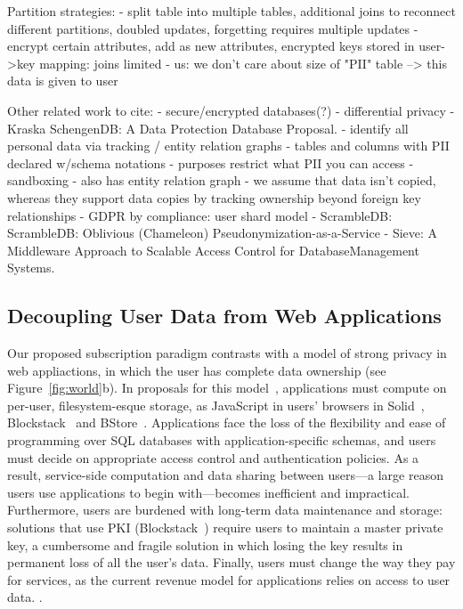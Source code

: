 Partition strategies:
- split table into multiple tables, additional joins to reconnect different partitions, doubled updates, forgetting requires multiple
updates
- encrypt certain attributes, add as new attributes, encrypted keys stored in user->key mapping: joins limited
- us: we don't care about size of "PII" table --> this data is given to user

Other related work to cite: 
- secure/encrypted databases(?)
- differential privacy
- Kraska SchengenDB: A Data Protection Database Proposal.
    - identify all personal data via tracking / entity relation graphs
    - tables and columns with PII declared w/schema notations
    - purposes restrict what PII you can access
    - sandboxing
    - also has entity relation graph
    - we assume that data isn't copied, whereas they support data copies by tracking ownership
    beyond foreign key relationships
- GDPR by compliance: user shard model  
- ScrambleDB: ScrambleDB: Oblivious (Chameleon) Pseudonymization-as-a-Service
- Sieve: A Middleware Approach to Scalable Access Control for DatabaseManagement Systems. 

\subsection{Decoupling User Data from Web Applications}
Our proposed subscription paradigm contrasts with a model of strong privacy in web appliactions, in
which the user has complete data ownership (see Figure~\ref{fig:world}b). In proposals for this
model~\cite{solid, amber, w5, blockstack, bstore}, applications must compute on per-user, filesystem-esque
storage, \eg as JavaScript in users' browsers in Solid~\cite{solid}, Blockstack~\cite{blockstack} and
BStore~\cite{bstore}. Applications face the loss of the flexibility and ease of programming over SQL
databases with application-specific schemas, and users must decide on appropriate access control and
authentication policies. As a result, service-side computation and data sharing between users---a
large reason users use applications to begin with---becomes inefficient and impractical. 
%
Furthermore, users are burdened with long-term data maintenance and storage: solutions that use PKI
(\eg Blockstack~\cite{blockstack}) require users to maintain a
master private key, a cumbersome and fragile solution in which losing the key results in permanent
loss of all the user's data.
%
Finally, users must change the way they pay for services, as the current revenue model for
applications relies on access to user data. 
.

